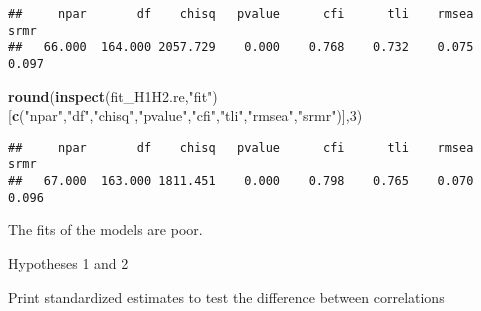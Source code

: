 \documentclass[
]{article}
\newenvironment{Shaded}{\begin{snugshade}}{\end{snugshade}}
\newcommand{\DecValTok}[1]{\textcolor[rgb]{0.00,0.00,0.81}{#1}}
\newcommand{\KeywordTok}[1]{\textcolor[rgb]{0.13,0.29,0.53}{\textbf{#1}}}
\newcommand{\NormalTok}[1]{#1}
\newcommand{\OperatorTok}[1]{\textcolor[rgb]{0.81,0.36,0.00}{\textbf{#1}}}
\newcommand{\StringTok}[1]{\textcolor[rgb]{0.31,0.60,0.02}{#1}}
\begin{document}
\begin{verbatim}
##     npar       df    chisq   pvalue      cfi      tli    rmsea     srmr 
##   66.000  164.000 2057.729    0.000    0.768    0.732    0.075    0.097
\end{verbatim}

\begin{Shaded}
\begin{Highlighting}[]
\KeywordTok{round}\NormalTok{(}\KeywordTok{inspect}\NormalTok{(fit_H1H2.re,}\StringTok{"fit"}\NormalTok{)}
\NormalTok{      [}\KeywordTok{c}\NormalTok{(}\StringTok{"npar"}\NormalTok{,}\StringTok{"df"}\NormalTok{,}\StringTok{"chisq"}\NormalTok{,}\StringTok{"pvalue"}\NormalTok{,}\StringTok{"cfi"}\NormalTok{,}\StringTok{"tli"}\NormalTok{,}\StringTok{"rmsea"}\NormalTok{,}\StringTok{"srmr"}\NormalTok{)],}\DecValTok{3}\NormalTok{)}
\end{Highlighting}
\end{Shaded}

\begin{verbatim}
##     npar       df    chisq   pvalue      cfi      tli    rmsea     srmr 
##   67.000  163.000 1811.451    0.000    0.798    0.765    0.070    0.096
\end{verbatim}

The fits of the models are poor.

Hypotheses 1 and 2

Print standardized estimates to test the difference between correlations

\begin{Shaded}
\end{Shaded}
\end{document}
